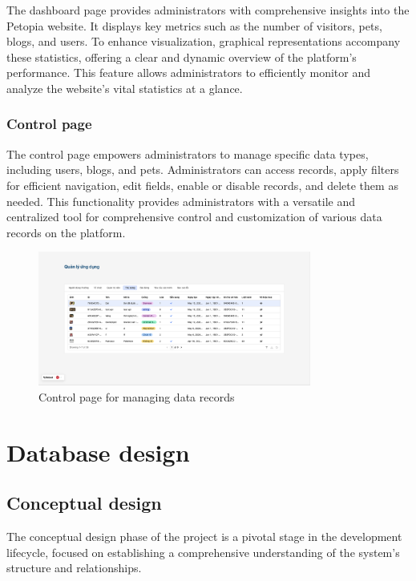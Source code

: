 The dashboard page provides administrators with comprehensive insights into the Petopia website. It displays key metrics such as the number of visitors, pets, blogs, and users. To enhance visualization, graphical representations accompany these statistics, offering a clear and dynamic overview of the platform's performance. This feature allows administrators to efficiently monitor and analyze the website's vital statistics at a glance.

\subsubsection{Control page}

The control page empowers administrators to manage specific data types, including users, blogs, and pets. Administrators can access records, apply filters for efficient navigation, edit fields, enable or disable records, and delete them as needed. This functionality provides administrators with a versatile and centralized tool for comprehensive control and customization of various data records on the platform.

\begin {figure}[H]
\centering
\includegraphics[width=0.8\textwidth]{Figures/UI/control_bo_ui.png}
\caption{Control page for managing data records}
\end{figure}

\section{Database design}

\subsection{Conceptual design}

The conceptual design phase of the project is a pivotal stage in the development lifecycle, focused on establishing a comprehensive understanding of the system's structure and relationships.


